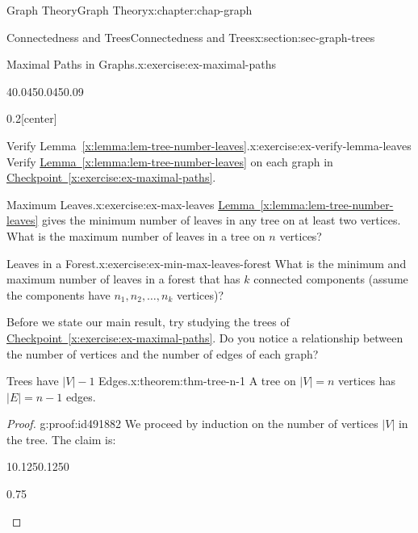 \documentclass[oneside,10pt,]{book}
\newcommand{\xreffont}{\relax}
\numberwithin{equation}{section}
\begin{document}
\begin{chapterptx}{Graph Theory}{}{Graph Theory}{}{}{x:chapter:chap-graph}
\begin{sectionptx}{Connectedness and Trees}{}{Connectedness and Trees}{}{}{x:section:sec-graph-trees}
\begin{inlineexercise}{Maximal Paths in Graphs.}{x:exercise:ex-maximal-paths}
\begin{sidebyside}{4}{0.045}{0.045}{0.09}
\begin{sbspanel}{0.2}[center]
{
}%
\end{sbspanel}%
\end{sidebyside}%
\end{inlineexercise}
\begin{inlineexercise}{Verify Lemma~{\xreffont\ref*{x:lemma:lem-tree-number-leaves}}.}{x:exercise:ex-verify-lemma-leaves}%
Verify \hyperref[x:lemma:lem-tree-number-leaves]{Lemma~{\xreffont\ref{x:lemma:lem-tree-number-leaves}}} on each graph in \hyperref[x:exercise:ex-maximal-paths]{Checkpoint~{\xreffont\ref{x:exercise:ex-maximal-paths}}}.%
\end{inlineexercise}
\begin{inlineexercise}{Maximum Leaves.}{x:exercise:ex-max-leaves}%
\hyperref[x:lemma:lem-tree-number-leaves]{Lemma~{\xreffont\ref{x:lemma:lem-tree-number-leaves}}} gives the minimum number of leaves in any tree on at least two vertices. What is the maximum number of leaves in a tree on \(n\) vertices?%
\end{inlineexercise}
\begin{inlineexercise}{Leaves in a Forest.}{x:exercise:ex-min-max-leaves-forest}%
What is the minimum and maximum number of leaves in a forest that has \(k\) connected components (assume the components have \(n_1, n_2, \ldots, n_k\) vertices)?%
\end{inlineexercise}
Before we state our main result, try studying the trees of \hyperref[x:exercise:ex-maximal-paths]{Checkpoint~{\xreffont\ref{x:exercise:ex-maximal-paths}}}. Do you notice a relationship between the number of vertices and the number of edges of each graph?%
\begin{theorem}{Trees have \(|V|-1\) Edges.}{}{x:theorem:thm-tree-n-1}%
A tree on \(|V| = n\) vertices has \(|E| = n-1\) edges.%
\end{theorem}
\begin{proof}{}{g:proof:id491882}
We proceed by induction on the number of vertices \(|V|\) in the tree. The claim is:%
\begin{sidebyside}{1}{0.125}{0.125}{0}%
\begin{sbspanel}{0.75}%

\end{sbspanel}
\end{sidebyside}
\end{proof}
\end{sectionptx}
\end{chapterptx}
\end{document}
